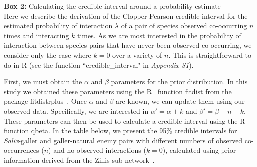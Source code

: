 \documentclass[12pt]{article}
\begin{document}
\clearpage

\begin{fullbox}{}
    \begin{spacing}{1.0}
    \textbf{Box 2: }Calculating the credible interval around a probability estimate\\
  \indent Here we describe the derivation of the Clopper-Pearson credible interval for the estimated probability of interaction $\lambda$ of a pair of species observed co-occurring $n$ times and interacting $k$ times. As we are most interested in the probability of interaction between species pairs that have never been observed co-occurring, we consider only the case where $k=0$ over a variety of $n$. This is straightforward to do in R (see the function ``credible\_interval" in \emph{Appendix S1}). 


  First, we must obtain the $\alpha$ and $\beta$ parameters for the prior distribution. In this study we obtained these parameters using the R~\citep{R} function fitdist from the package fitdistrplus~\citep{fitdistrplus}. Once $\alpha$ and $\beta$ are known, we can update them using our observed data. Specifically, we are interested in $\alpha'=\alpha+k$ and $\beta'=\beta+n-k$. These parameters can then be used to calculate a credible interval using the R~\citep{R} function qbeta. In the table below, we present the 95\% credible intervals for \emph{Salix}-galler and galler-natural enemy pairs with different numbers of observed co-occurrences ($n$) and no observed interactions ($k=0$), calculated using prior information derived from the Zillis sub-network~\citep{Kopelke2017}.


\end{spacing}
\end{fullbox}
\end{document}
